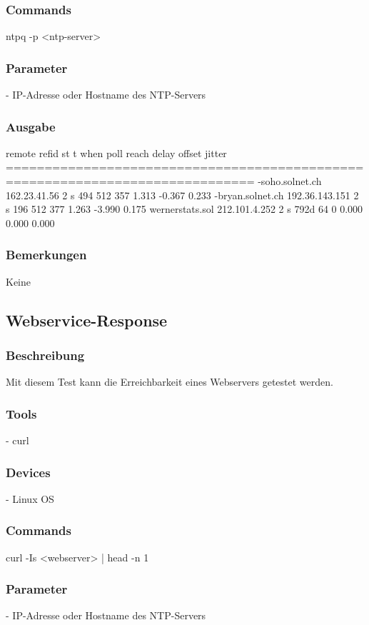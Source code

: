 \documentclass[a4,12pt]{scrartcl}
\begin{document}
\subsubsection{Commands}
ntpq -p <ntp-server>
\subsubsection{Parameter}
- IP-Adresse oder Hostname des NTP-Servers
\subsubsection{Ausgabe}
     remote           refid      st t when poll reach   delay   offset  jitter\newline
==============================================================================\newline
-soho.solnet.ch  162.23.41.56     2 s  494  512  357    1.313   -0.367   0.233\newline
-bryan.solnet.ch 192.36.143.151   2 s  196  512  377    1.263   -3.990   0.175\newline
 wernerstats.sol 212.101.4.252    2 s 792d   64    0    0.000    0.000   0.000\newline \subsubsection{Bemerkungen}
Keine


\subsection{Webservice-Response}
\subsubsection{Beschreibung}
Mit diesem Test kann die Erreichbarkeit eines Webservers getestet werden.
\subsubsection{Tools}
- curl
\subsubsection{Devices}
- Linux OS
\subsubsection{Commands}
curl -Is <webserver> | head -n 1
\subsubsection{Parameter}
- IP-Adresse oder Hostname des NTP-Servers
\end{document}
